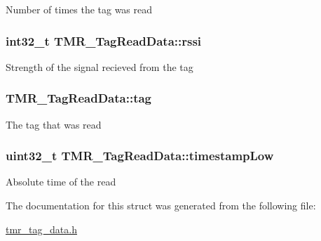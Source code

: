 Number of times the tag was read \hypertarget{struct_t_m_r___tag_read_data_6c9fd6cbdabde97ab2d487a40b174adf}{
\subsubsection[{rssi}]{\setlength{\rightskip}{0pt plus 5cm}int32\_\-t {\bf TMR\_\-TagReadData::rssi}}}
\label{struct_t_m_r___tag_read_data_6c9fd6cbdabde97ab2d487a40b174adf}


Strength of the signal recieved from the tag \hypertarget{struct_t_m_r___tag_read_data_754ee5821d22244d4d9914b29454edce}{
\subsubsection[{tag}]{ {\bf TMR\_\-TagReadData::tag}}}
\label{struct_t_m_r___tag_read_data_754ee5821d22244d4d9914b29454edce}


The tag that was read \hypertarget{struct_t_m_r___tag_read_data_c14a559c7e7dfe3ff836be0ed0301279}{
\subsubsection[{timestampLow}]{\setlength{\rightskip}{0pt plus 5cm}uint32\_\-t {\bf TMR\_\-TagReadData::timestampLow}}}
\label{struct_t_m_r___tag_read_data_c14a559c7e7dfe3ff836be0ed0301279}


Absolute time of the read 

The documentation for this struct was generated from the following file:\begin{CompactItemize}
\item 
\hyperlink{tmr__tag__data_8h}{tmr\_\-tag\_\-data.h}\end{CompactItemize}
